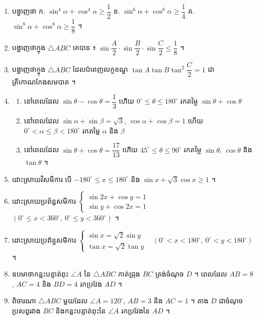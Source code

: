 \begin{enumerate}[1]
\begin{tasks}
    \task $\dfrac{1 - \sin x}{1 - 3\sin x} < \dfrac{1 + \sin x}{1 - 9\sin^2 x}$ ។
  \end{tasks}
  \item បង្ហាញថា \quad ក. $\sin^4\alpha + \cos^4\alpha \ge \dfrac{1}{2}$ \quad ខ. $\sin^6\alpha + \cos^6\alpha \ge \dfrac{1}{4}$ \quad គ. $\sin^8\alpha + \cos^8\alpha \ge \dfrac{1}{8}$ ។
  \item បង្ហាញថាក្នុង $\triangle ABC$ គេបាន ៖ $\sin\dfrac{A}{2} \cdot \sin\dfrac{B}{2} \cdot \sin\dfrac{C}{2} \le \dfrac{1}{8}$ ។
  \item បង្ហាញថាក្នុង $\triangle ABC$ ដែលបំពេញលក្ខខណ្ឌ $\tan A\tan B\tan^2\dfrac{C}{2} = 1$ ជាត្រីកោណកែងសមបាត ។
  \item
  \begin{enumerate}[a]
    \item នៅពេលដែល $\sin\theta - \cos\theta = \dfrac{1}{3}$ ហើយ $0^\circ \le \theta \le 180^\circ$ រកតម្លៃ $\sin\theta + \cos\theta$
    \item នៅពេលដែល $\sin\alpha + \sin\beta = \sqrt{3}$, $\cos\alpha + \cos\beta = 1$ ហើយ $0^\circ < \alpha \le \beta < 180^\circ$ រកតម្លៃ $\alpha$ និង $\beta$
    \item នៅពេលដែល $\sin\theta + \cos\theta = \dfrac{17}{13}$ ហើយ $45^\circ \le \theta \le 90^\circ$ រកតម្លៃ $\sin\theta$, $\cos\theta$ និង $\tan\theta$ ។
  \end{enumerate}
  \item ដោះស្រាយវិសមីការ បើ $-180^\circ \le x \le 180^\circ$ និង $\sin x + \sqrt{3}\cos x \ge 1$ ។
  \item ដោះស្រាយប្រព័ន្ធសមីការ $\begin{cases} \sin 2x + \cos y = 1\\ \sin y + \cos 2x = 1 \end{cases}$ \ $(0^\circ \le x < 360^\circ, \ 0^\circ \le y < 360^\circ)$ ។
  \item ដោះស្រាយប្រព័ន្ធសមីការ $\begin{cases} \sin x = \sqrt{2}\sin y\\ \tan x = \sqrt{2}\tan y \end{cases}$ \ $(0^\circ < x < 180^\circ, \ 0^\circ < y < 180^\circ)$ ។
  \item ឧបមាថាកន្លះបន្ទាត់ពុះ $\angle A$ នៃ $\triangle ABC$ កាត់ជ្រុង $BC$ ត្រង់ចំណុច $D$ ។ ពេលដែល $AB = 8$, $AC = 4$ និង $BD = 4$ រកប្រវែង $AD$ ។
  \item ពិចារណា $\triangle ABC$ មួយដែល $\angle A = 120^\circ$, $AB = 3$ និង $AC = 1$ ។ តាង $D$ ជាចំណុចប្រសព្វរវាង $BC$ និងកន្លះបន្ទាត់ពុះនៃ $\angle A$ រកប្រវែងនៃ $AD$ ។

\end{enumerate}
